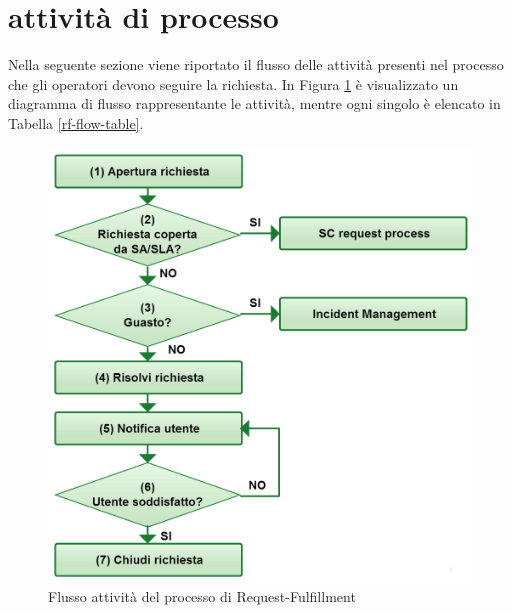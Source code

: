 %
%
\section[Attività di processo]{attività di processo}
\label{rf-flow}
Nella seguente sezione viene riportato il flusso delle attività presenti nel processo che gli operatori devono seguire la richiesta. In Figura \ref{rf-flow-img} è visualizzato un diagramma di flusso rappresentante le attività, mentre ogni singolo  è elencato in Tabella \ref{rf-flow-table}.
\begin{figure}[htbp]
\centering
\includegraphics[scale=0.3]{Images/Diagrams/Request_fulfillment.png}
\caption{Flusso attività del processo di \ac{Request-Fulfillment}}
\label{rf-flow-img}
\end{figure}

